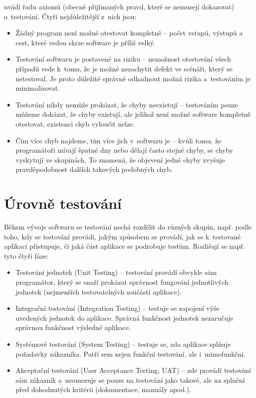 	\citep{Patton} uvádí řadu axiomů (obecně přijímaných pravd, které se nemusejí dokazovat) o~testování. Čtyři nejdůležitější z~nich jsou:
		\begin{itemize}
			\item Žádný program není možné otestovat kompletně -- počet vstupů, výstupů a cest, které vedou skrze software je příliš velký.
			\item Testování softwaru je postavené na riziku -- nemožnost otestování všech případů vede k~tomu, že je možné nezachytit defekt ve scénáři, který se netestoval. Je proto důležité správně odhadnout možná rizika a~testováním je minimalizovat.
			\item Testování nikdy nemůže prokázat, že chyby neexistují -- testováním pouze můžeme dokázat, že chyby existují, ale jelikož není možné software kompletně otestovat, existenci chyb vyloučit nelze.
			\item Čím více chyb najdeme, tím více jich v~softwaru je -- kvůli tomu, že programátoři mívají špatné dny nebo dělají často stejné chyby, se chyby vyskytují ve skupinách. To znamená, že objevení jedné chyby zvyšuje pravděpodobnost dalších takových podobných chyb.
		\end{itemize}
		
		\section{Úrovně testování}
		Během vývoje softwaru se testování nechá rozdělit do různých skupin, např. podle toho, kdy se testování provádí, jakým způsobem se provádí, jak se k~testované aplikaci přistupuje, či jaká část aplikace se podrobuje testům. Rozlišují se např. tyto čtyři fáze:
			\begin{itemize}
				\item Testování jednotek (Unit Testing) -- testování provádí obvykle sám programátor, který se snaží prokázat správnost fungování jednotlivých jednotek (nejmenších testovatelných součástí aplikace).
				\item Integrační testování (Integration Testing) -- testuje se zapojení výše uvedených jednotek do aplikace. Správná funkčnost jednotek nezaručuje správnou funkčnost výsledné aplikace.
				\item Systémové testování (System Testing) -- testuje se, zda aplikace splňuje požadavky zákazníka. Patří sem nejen funkční testování, ale i~mimofunkční.
				\item Akceptační testování (User Acceptance Testing, UAT) -- zde provádí testování sám zákazník a~neomezuje se pouze na testování jako takové, ale na splnění před dohodnutých kritérii (dokumentace, manuály apod.).
			\end{itemize}
			
